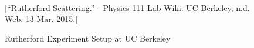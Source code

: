 \begin{figure}[htp]
  \begin{center}
     \\
  \end{center}
  \caption{Rutherford Experiment Setup at UC Berkeley}[\footnotesize{``Rutherford Scattering.'' - Physics 111-Lab Wiki. UC Berkeley, n.d. Web. 13 Mar. 2015.}]
  \label{ThreeFigs}
\end{figure}

